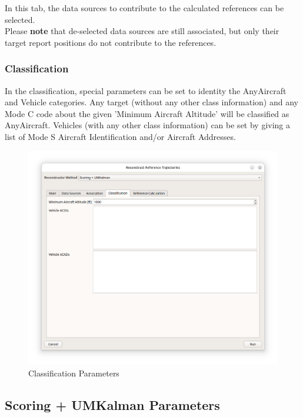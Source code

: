 In this tab, the data sources to contribute to the calculated references can be selected. \\

Please \textbf{note} that de-selected data sources are still associated, but only their target report positions do not contribute to the references.

\subsubsection{Classification}

In the classification, special parameters can be set to identity the AnyAircraft and Vehicle categories. Any target (without any other class information) and any Mode C code about the given 'Minimum Aircraft Altitude' will be classified as AnyAircraft. Vehicles (with any other class information) can be set by giving a list of Mode S Aircraft Identification and/or Aircraft Addresses. \\

\begin{figure}[H]
    \center
      \includegraphics[width=16cm]{figures/dialog_class.png}
    \caption{Classification Parameters}
\end{figure}

\subsection{Scoring + UMKalman Parameters}

